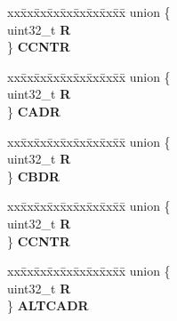 \begin{DoxyCompactItemize}
\begin{tabbing}
\end{tabbing}\item 
\mbox{\label{structEMIOS__tag_1_1EMIOS__CH__tag_ad00c0ead052cd2e5b5fdabea97f0b925}} 
\begin{tabbing}
xx\=xx\=xx\=xx\=xx\=xx\=xx\=xx\=xx\=\kill
union \{\\
\>uint32\_t {\bfseries R}\\
\} {\bfseries CCNTR}\\

\end{tabbing}\item 
\mbox{\label{structEMIOS__tag_1_1EMIOS__CH__tag_ae759789c9c1078ad9c83db628265ec94}} 
\begin{tabbing}
xx\=xx\=xx\=xx\=xx\=xx\=xx\=xx\=xx\=\kill
union \{\\
\>uint32\_t {\bfseries R}\\
\} {\bfseries CADR}\\

\end{tabbing}\item 
\mbox{\label{structEMIOS__tag_1_1EMIOS__CH__tag_a61066122d122579a6514b8f08096c8d0}} 
\begin{tabbing}
xx\=xx\=xx\=xx\=xx\=xx\=xx\=xx\=xx\=\kill
union \{\\
\>uint32\_t {\bfseries R}\\
\} {\bfseries CBDR}\\

\end{tabbing}\item 
\mbox{\label{structEMIOS__tag_1_1EMIOS__CH__tag_ab62d33e1a7fbcecddfac0864182784bb}} 
\begin{tabbing}
xx\=xx\=xx\=xx\=xx\=xx\=xx\=xx\=xx\=\kill
union \{\\
\>uint32\_t {\bfseries R}\\
\} {\bfseries CCNTR}\\

\end{tabbing}\item 
\mbox{\label{structEMIOS__tag_1_1EMIOS__CH__tag_a67aeb33df12324ce9a5734ca160a715e}} 
\begin{tabbing}
xx\=xx\=xx\=xx\=xx\=xx\=xx\=xx\=xx\=\kill
union \{\\
\>uint32\_t {\bfseries R}\\
\} {\bfseries ALTCADR}\\


\end{tabbing}
\end{DoxyCompactItemize}

